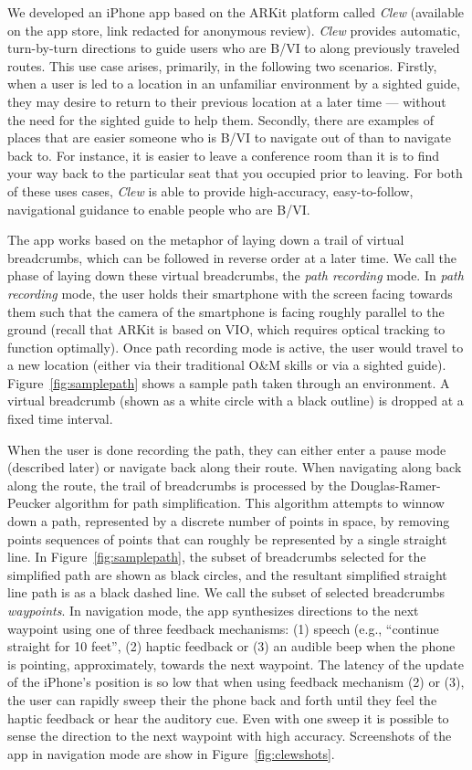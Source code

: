 \documentclass[chi_draft]{sigchi}
\newcommand{\BVI}{B/VI\xspace}
\newcommand{\OM}{O\&M\xspace}
\begin{document}
We developed an iPhone app based on the ARKit platform called \emph{Clew} (available on the app store, link redacted for anonymous review).  \emph{Clew} provides automatic, turn-by-turn directions to guide users who are \BVI to along previously traveled routes.  This use case arises, primarily, in the following two scenarios.  Firstly, when a user is led to a location in an unfamiliar environment by a sighted guide, they may desire to return to their previous location at a later time --- without the need for the sighted guide to help them.  Secondly, there are examples of places that are easier someone who is \BVI to navigate out of than to navigate back to.  For instance, it is easier to leave a conference room than it is to find your way back to the particular seat that you occupied prior to leaving.  For both of these uses cases, \emph{Clew} is able to provide high-accuracy, easy-to-follow, navigational guidance to enable people who are \BVI.

The app works based on the metaphor of laying down a trail of virtual breadcrumbs, which can be followed in reverse order at a later time.  We call the phase of laying down these virtual breadcrumbs, the \emph{path recording} mode.  In \emph{path recording} mode, the user holds their smartphone with the screen facing towards them such that the camera of the smartphone is facing roughly parallel to the ground (recall that ARKit is based on VIO, which requires optical tracking to function optimally).  Once path recording mode is active, the user would  travel to a new location (either via their traditional \OM skills or via a sighted guide).  Figure~\ref{fig:samplepath} shows a sample path taken through an environment.  A virtual breadcrumb (shown as a white circle with a black outline) is dropped at a fixed time interval.

When the user is done recording the path, they can either enter a pause mode (described later) or navigate back along their route.  When navigating along back along the route, the trail of breadcrumbs is processed by the Douglas-Ramer-Peucker algorithm \cite{douglas1973algorithms} for path simplification.  This algorithm attempts to winnow down a path, represented by a discrete number of points in space, by removing points sequences of points that can roughly be represented by a single straight line.  In Figure~\ref{fig:samplepath}, the subset of breadcrumbs selected for the simplified path are shown as black circles, and the resultant simplified straight line path is as a black dashed line.  We call the subset of selected breadcrumbs \emph{waypoints}.  In navigation mode, the app synthesizes directions to the next waypoint using one of three feedback mechanisms: (1) speech (e.g., ``continue straight for 10 feet'', (2) haptic feedback or (3) an audible beep when the phone is pointing, approximately, towards the next waypoint.  The latency of the update of the iPhone's position is so low that when using feedback mechanism (2) or (3), the user can rapidly sweep their the phone back and forth until they feel the haptic feedback or hear the auditory cue.  Even with one sweep it is possible to sense the direction to the next waypoint with high accuracy.  Screenshots of the app in navigation mode are show in Figure~\ref{fig:clewshots}.
\end{document}
